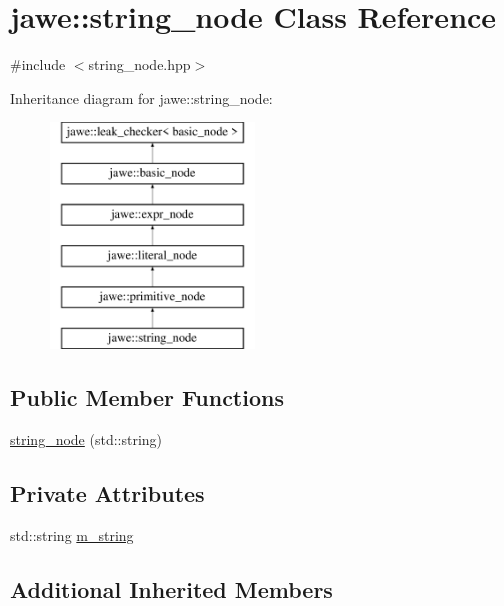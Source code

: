 \hypertarget{classjawe_1_1string__node}{}\section{jawe\+:\+:string\+\_\+node Class Reference}
\label{classjawe_1_1string__node}


{\ttfamily \#include $<$string\+\_\+node.\+hpp$>$}

Inheritance diagram for jawe\+:\+:string\+\_\+node\+:\begin{figure}[H]
\begin{center}
\leavevmode
\includegraphics[height=6.000000cm]{classjawe_1_1string__node}
\end{center}
\end{figure}
\subsection*{Public Member Functions}
\begin{DoxyCompactItemize}
\item 
\hyperlink{classjawe_1_1string__node_a96262bdce7a1297f891434e56290b069}{string\+\_\+node} (std\+::string)
\end{DoxyCompactItemize}
\subsection*{Private Attributes}
\begin{DoxyCompactItemize}
\item 
std\+::string \hyperlink{classjawe_1_1string__node_a97cbd4067950b166ab489ff22dc46358}{m\+\_\+string}
\end{DoxyCompactItemize}
\subsection*{Additional Inherited Members}


